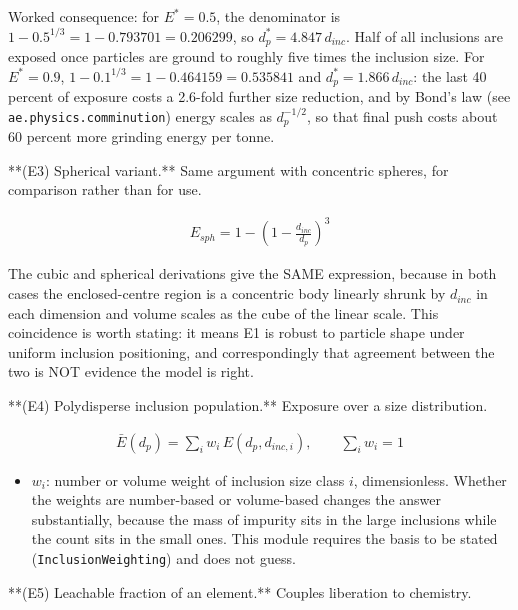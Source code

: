 \documentclass[10pt,a4paper,twoside]{report}
\begin{document}
Worked consequence: for $E^{*} = 0.5$, the denominator is $1 - 0.5^{1/3} = 1 - 0.793701 = 0.206299$, so $d_p^{*} = 4.847 \, d_{inc}$. Half of all inclusions are exposed once particles are ground to roughly five times the inclusion size. For $E^{*} = 0.9$, $1 - 0.1^{1/3} = 1 - 0.464159 = 0.535841$ and $d_p^{*} = 1.866 \, d_{inc}$: the last 40 percent of exposure costs a 2.6-fold further size reduction, and by Bond's law (see \texttt{ae.physics.comminution}) energy scales as $d_p^{-1/2}$, so that final push costs about 60 percent more grinding energy per tonne.

**(E3) Spherical variant.** Same argument with concentric spheres, for comparison rather than for use.

\begin{equation*}
\begin{gathered}
E_{sph} = 1 - \left( 1 - \frac{d_{inc}}{d_p} \right)^{3}
\end{gathered}
\end{equation*}

The cubic and spherical derivations give the SAME expression, because in both cases the enclosed-centre region is a concentric body linearly shrunk by $d_{inc}$ in each dimension and volume scales as the cube of the linear scale. This coincidence is worth stating: it means E1 is robust to particle shape under uniform inclusion positioning, and correspondingly that agreement between the two is NOT evidence the model is right.

**(E4) Polydisperse inclusion population.** Exposure over a size distribution.

\begin{equation*}
\begin{gathered}
\bar{E}(d_p) = \sum_i w_i \, E(d_p, d_{inc,i}), \qquad \sum_i w_i = 1
\end{gathered}
\end{equation*}

\begin{itemize}
\item $w_i$: number or volume weight of inclusion size class $i$, dimensionless. Whether the weights are number-based or volume-based changes the answer substantially, because the mass of impurity sits in the large inclusions while the count sits in the small ones. This module requires the basis to be stated (\texttt{InclusionWeighting}) and does not guess.
\end{itemize}

**(E5) Leachable fraction of an element.** Couples liberation to chemistry.
\end{document}
